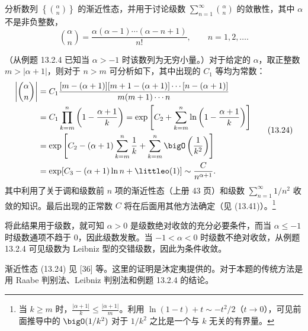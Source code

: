 \begin{xexample}[13.3.2]
分析数列 $\left\{\binom{\alpha}{n}\right\}$ 的渐近性态，并用于讨论级数 $\sum_{n=1}^{\infty}\binom{\alpha}{n}$ 的敛散性，其中 $\alpha$ 不是非负整数，
\[
\binom{\alpha}{n}=\frac{\alpha(\alpha-1)\cdots(\alpha-n+1)}{n!},\qquad n=1,2,\ldots.
\]
\end{xexample}
\begin{xsolution}
（从例题 13.2.4 已知当 $\alpha>-1$ 时该数列为无穷小量。）对于给定的 $\alpha$，取正整数 $m>|\alpha+1|$，则对于 $n>m$ 可分析如下，其中出现的 $C_1$ 等均为常数：
\begin{equation}
\begin{aligned}
\left|\binom{\alpha}{n}\right|
&=C_1\frac{[m-(\alpha+1)][m+1-(\alpha+1)]\cdots[n-(\alpha+1)]}{m(m+1)\cdots n}\\
&=C_1\prod_{k=m}^{n}\left(1-\frac{\alpha+1}{k}\right)
=\exp\left[C_2+\sum_{k=m}^{n}\ln\left(1-\frac{\alpha+1}{k}\right)\right]\\
&=\exp\left[C_2-(\alpha+1)\sum_{k=m}^{n}\frac1k+\sum_{k=m}^{n}\bigO\left(\frac1{k^2}\right)\right]\\
&=\exp[C_3-(\alpha+1)\ln n+\littleo(1)]
\sim\frac C{n^{\alpha+1}}.
\end{aligned}
\tag{13.24}
\end{equation}
其中利用了关于调和级数前 $n$ 项的渐近性态（上册 43 页）和级数 $\sum_{n=1}^{\infty}1/n^2$ 收敛的知识。最后出现的正常数 $C$ 将在后面用其他方法确定（见 (13.41)）。\footnote{当 $k\geq m$ 时，$\frac{|\alpha+1|}{k}\leq\frac{|\alpha+1|}{m}$。利用 $\ln(1-t)+t\sim-t^2/2$（$t\to0$），可见前面推导中的 $\bigO(1/k^2)$ 对于 $1/k^2$ 之比是一个与 $k$ 无关的有界量。}

将此结果用于级数，就可知 $\alpha>0$ 是级数绝对收敛的充分必要条件，而当 $\alpha\leq-1$ 时级数通项不趋于 0，因此级数发散。当 $-1<\alpha<0$ 时级数不绝对收敛，从例题 13.2.4 可见级数为 Leibniz 型的交错级数，因此为条件收敛。
\end{xsolution}

\begin{xremark}
渐近性态 (13.24) 见 [36] 等。这里的证明是沐定夷提供的。对于本题的传统方法是用 Raabe 判别法、Leibniz 判别法和例题 13.2.4 的结论。
\end{xremark}

